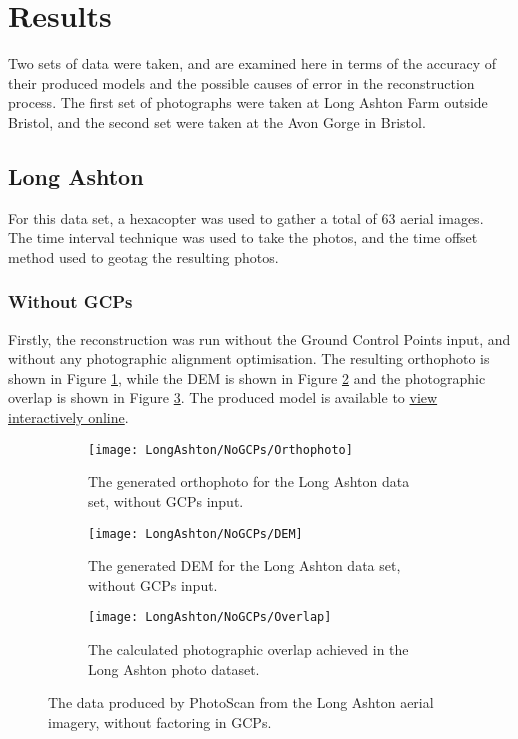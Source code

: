 \section{Results}

Two sets of data were taken, and are examined here in terms of the accuracy of
their produced models and the possible causes of error in the reconstruction
process. The first set of photographs were taken at Long Ashton Farm outside
Bristol, and the second set were taken at the Avon Gorge in Bristol.

\subsection{Long Ashton}
\label{sec:results/long-ashton}

For this data set, a hexacopter was used to gather a total of 63 aerial images.
The time interval technique was used to take the photos, and the time offset
method used to geotag the resulting photos.

\subsubsection{Without GCPs}
\label{sec:results/long-ashton/no-gcps}

Firstly, the reconstruction was run without the Ground Control Points input, and
without any photographic alignment optimisation. The resulting orthophoto is
shown in Figure \ref{img:long-ashton/no-gcps/orthophoto}, while the DEM is shown
in Figure \ref{img:long-ashton/no-gcps/dem} and the photographic overlap is shown
in Figure \ref{img:long-ashton/no-gcps/overlap}. The produced model is available
to \href{https://sketchfab.com/models/ad8a1d9f8c324eb592a9e4beabc5a51e}{view
interactively online}.

\begin{figure}
    \centering
    \begin{subfigure}[b]{0.3\textwidth}
        \texttt{[image: LongAshton/NoGCPs/Orthophoto]}
        \caption{The generated orthophoto for the Long Ashton data set, without
        GCPs input.}
        \label{img:long-ashton/no-gcps/orthophoto}
    \end{subfigure}
    \begin{subfigure}[b]{0.3\textwidth}
        \texttt{[image: LongAshton/NoGCPs/DEM]}
        \caption{The generated DEM for the Long Ashton data set, without GCPs
        input.}
        \label{img:long-ashton/no-gcps/dem}
    \end{subfigure}
    \begin{subfigure}[b]{0.3\textwidth}
        \texttt{[image: LongAshton/NoGCPs/Overlap]}
        \caption{The calculated photographic overlap achieved in the Long Ashton
        photo dataset.}
        \label{img:long-ashton/no-gcps/overlap}
    \end{subfigure}
    \caption{The data produced by PhotoScan from the Long Ashton aerial imagery,
    without factoring in GCPs.}
    \label{img:long-ashton/no-gcps}
\end{figure}

